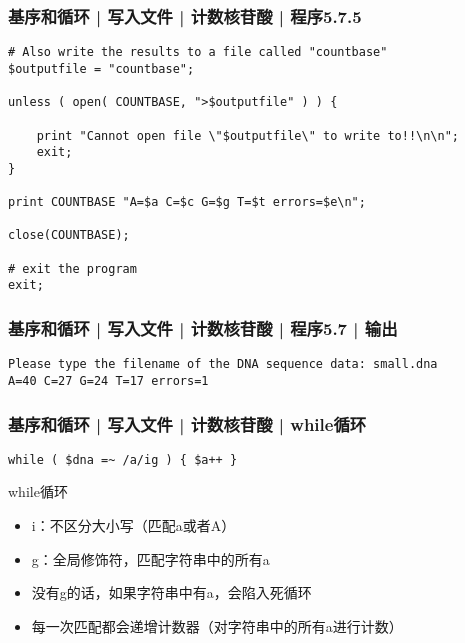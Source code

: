 \begin{frame}[fragile]
  \frametitle{基序和循环 | 写入文件 | 计数核苷酸 | 程序5.7.5}
\begin{lstlisting}[firstnumber=52,basicstyle=\small\tt]
# Also write the results to a file called "countbase"
$outputfile = "countbase";

unless ( open( COUNTBASE, ">$outputfile" ) ) {

    print "Cannot open file \"$outputfile\" to write to!!\n\n";
    exit;
}

print COUNTBASE "A=$a C=$c G=$g T=$t errors=$e\n";

close(COUNTBASE);

# exit the program
exit;
\end{lstlisting}
\end{frame}

\begin{frame}[fragile]
  \frametitle{基序和循环 | 写入文件 | 计数核苷酸 | 程序5.7 | 输出}
\begin{lstlisting}
Please type the filename of the DNA sequence data: small.dna
A=40 C=27 G=24 T=17 errors=1
\end{lstlisting}
\end{frame}

\begin{frame}[fragile]
  \frametitle{基序和循环 | 写入文件 | 计数核苷酸 | \alert{while循环}}
\begin{lstlisting}
while ( $dna =~ /a/ig ) { $a++ }
\end{lstlisting}
\pause
\begin{block}{while循环}
  \begin{itemize}
    \item i：不区分大小写（匹配a或者A）
    \item g：全局修饰符，匹配字符串中的所有a
    \item 没有g的话，如果字符串中有a，会陷入死循环
    \item 每一次匹配都会递增计数器（对字符串中的所有a进行计数）
  \end{itemize}
\end{block}
\end{frame}

